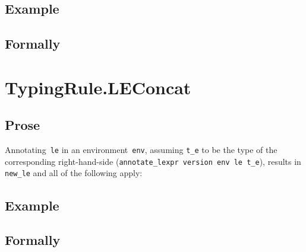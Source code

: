 \documentclass{book}
\begin{document}
\begin{itemize}
  \subsection{Example}



\begin{emptyformal}
    \subsection{Formally}
\end{emptyformal}


\section{TypingRule.LEConcat \label{sec:TypingRule.LEConcat}}

    \subsection{Prose}
   Annotating~\texttt{le} in an environment~\texttt{env}, assuming
\texttt{t\_e} to be the type of the corresponding right-hand-side
(\texttt{annotate\_lexpr version env le t\_e}), results in \texttt{new\_le} and
all of the following apply:

  \subsection{Example}



\begin{emptyformal}
    \subsection{Formally}

\end{emptyformal}



\end{itemize}
\end{document}
